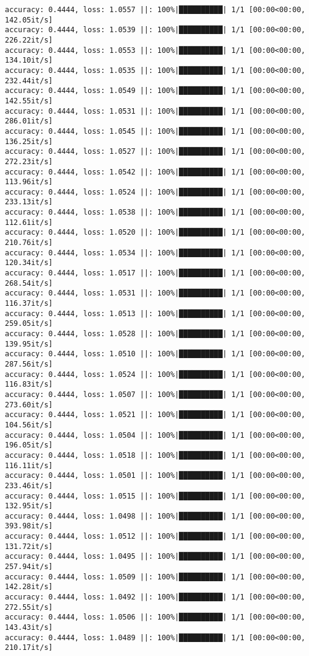 \documentclass[
]{article}
\begin{document}
\begin{verbatim}
accuracy: 0.4444, loss: 1.0557 ||: 100%|██████████| 1/1 [00:00<00:00, 142.05it/s]
accuracy: 0.4444, loss: 1.0539 ||: 100%|██████████| 1/1 [00:00<00:00, 226.22it/s]
accuracy: 0.4444, loss: 1.0553 ||: 100%|██████████| 1/1 [00:00<00:00, 134.10it/s]
accuracy: 0.4444, loss: 1.0535 ||: 100%|██████████| 1/1 [00:00<00:00, 232.44it/s]
accuracy: 0.4444, loss: 1.0549 ||: 100%|██████████| 1/1 [00:00<00:00, 142.55it/s]
accuracy: 0.4444, loss: 1.0531 ||: 100%|██████████| 1/1 [00:00<00:00, 286.01it/s]
accuracy: 0.4444, loss: 1.0545 ||: 100%|██████████| 1/1 [00:00<00:00, 136.25it/s]
accuracy: 0.4444, loss: 1.0527 ||: 100%|██████████| 1/1 [00:00<00:00, 272.23it/s]
accuracy: 0.4444, loss: 1.0542 ||: 100%|██████████| 1/1 [00:00<00:00, 113.96it/s]
accuracy: 0.4444, loss: 1.0524 ||: 100%|██████████| 1/1 [00:00<00:00, 233.13it/s]
accuracy: 0.4444, loss: 1.0538 ||: 100%|██████████| 1/1 [00:00<00:00, 112.61it/s]
accuracy: 0.4444, loss: 1.0520 ||: 100%|██████████| 1/1 [00:00<00:00, 210.76it/s]
accuracy: 0.4444, loss: 1.0534 ||: 100%|██████████| 1/1 [00:00<00:00, 120.34it/s]
accuracy: 0.4444, loss: 1.0517 ||: 100%|██████████| 1/1 [00:00<00:00, 268.54it/s]
accuracy: 0.4444, loss: 1.0531 ||: 100%|██████████| 1/1 [00:00<00:00, 116.37it/s]
accuracy: 0.4444, loss: 1.0513 ||: 100%|██████████| 1/1 [00:00<00:00, 259.05it/s]
accuracy: 0.4444, loss: 1.0528 ||: 100%|██████████| 1/1 [00:00<00:00, 139.95it/s]
accuracy: 0.4444, loss: 1.0510 ||: 100%|██████████| 1/1 [00:00<00:00, 287.56it/s]
accuracy: 0.4444, loss: 1.0524 ||: 100%|██████████| 1/1 [00:00<00:00, 116.83it/s]
accuracy: 0.4444, loss: 1.0507 ||: 100%|██████████| 1/1 [00:00<00:00, 273.60it/s]
accuracy: 0.4444, loss: 1.0521 ||: 100%|██████████| 1/1 [00:00<00:00, 104.56it/s]
accuracy: 0.4444, loss: 1.0504 ||: 100%|██████████| 1/1 [00:00<00:00, 196.05it/s]
accuracy: 0.4444, loss: 1.0518 ||: 100%|██████████| 1/1 [00:00<00:00, 116.11it/s]
accuracy: 0.4444, loss: 1.0501 ||: 100%|██████████| 1/1 [00:00<00:00, 233.46it/s]
accuracy: 0.4444, loss: 1.0515 ||: 100%|██████████| 1/1 [00:00<00:00, 132.95it/s]
accuracy: 0.4444, loss: 1.0498 ||: 100%|██████████| 1/1 [00:00<00:00, 393.98it/s]
accuracy: 0.4444, loss: 1.0512 ||: 100%|██████████| 1/1 [00:00<00:00, 131.72it/s]
accuracy: 0.4444, loss: 1.0495 ||: 100%|██████████| 1/1 [00:00<00:00, 257.94it/s]
accuracy: 0.4444, loss: 1.0509 ||: 100%|██████████| 1/1 [00:00<00:00, 142.28it/s]
accuracy: 0.4444, loss: 1.0492 ||: 100%|██████████| 1/1 [00:00<00:00, 272.55it/s]
accuracy: 0.4444, loss: 1.0506 ||: 100%|██████████| 1/1 [00:00<00:00, 143.43it/s]
accuracy: 0.4444, loss: 1.0489 ||: 100%|██████████| 1/1 [00:00<00:00, 210.17it/s]

\end{verbatim}
\end{document}
